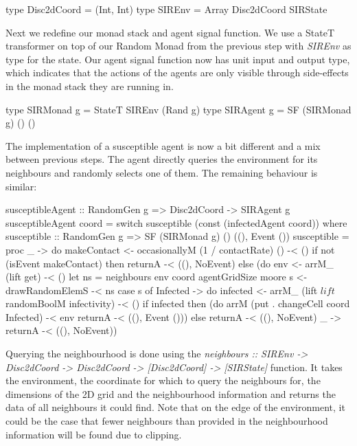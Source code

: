 \begin{HaskellCode}
type Disc2dCoord = (Int, Int)
type SIREnv      = Array Disc2dCoord SIRState
\end{HaskellCode}

Next we redefine our monad stack and agent signal function. We use a StateT transformer on top of our Random Monad from the previous step with \textit{SIREnv} as type for the state. Our agent signal function now has unit input and output type, which indicates that the actions of the agents are only visible through side-effects in the monad stack they are running in.

\begin{HaskellCode}
type SIRMonad g = StateT SIREnv (Rand g)
type SIRAgent g = SF (SIRMonad g) () ()
\end{HaskellCode}

The implementation of a susceptible agent is now a bit different and a mix between previous steps. The agent directly queries the environment for its neighbours and randomly selects one of them. The remaining behaviour is similar:

\begin{HaskellCode}
susceptibleAgent :: RandomGen g => Disc2dCoord -> SIRAgent g
susceptibleAgent coord
    = switch susceptible (const (infectedAgent coord))
  where
    susceptible :: RandomGen g 
      => SF (SIRMonad g) () ((), Event ())
    susceptible = proc _ -> do
      makeContact <- occasionallyM (1 / contactRate) () -< ()
      if not (isEvent makeContact)
        then returnA -< ((), NoEvent)
        else (do
          env <- arrM_ (lift get) -< ()
          let ns = neighbours env coord agentGridSize moore
          s <- drawRandomElemS -< ns
          case s of
            Infected -> do
              infected <- arrM_ 
                (lift $ lift $ randomBoolM infectivity) -< ()
              if infected 
                then (do
                  arrM (put . changeCell coord Infected) -< env
                  returnA -< ((), Event ()))
                else returnA -< ((), NoEvent)
            _        -> returnA -< ((), NoEvent))

\end{HaskellCode}
Querying the neighbourhood is done using the \textit{neighbours :: SIREnv -> Disc2dCoord -> Disc2dCoord -> [Disc2dCoord] -> [SIRState]} function. It takes the environment, the coordinate for which to query the neighbours for, the dimensions of the 2D grid and the neighbourhood information and returns the data of all neighbours it could find. Note that on the edge of the environment, it could be the case that fewer neighbours than provided in the neighbourhood information will be found due to clipping.

